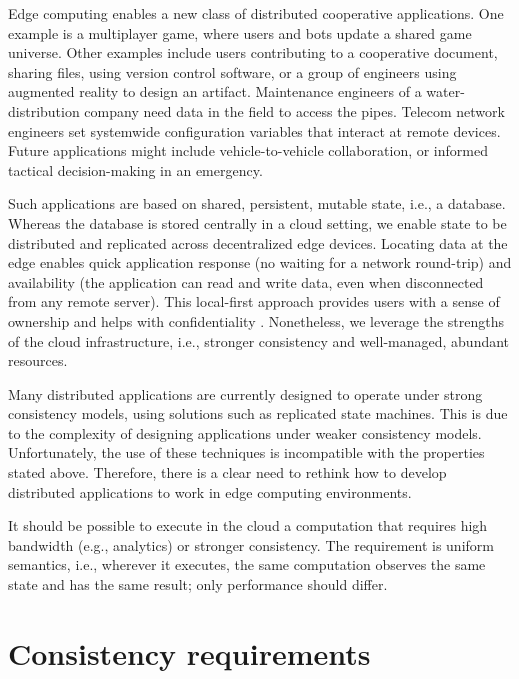 
Edge computing enables a new class of distributed {cooperative}
applications.%
One example is a multiplayer game, where users and bots update a shared
game universe.
Other examples include users contributing to a cooperative document,
sharing files, using version control software, or a group of engineers
using augmented reality to design an artifact.
Maintenance engineers of a water-distribution company need data in the
field to access the pipes.
Telecom network engineers set systemwide configuration variables that
interact at remote devices.
Future applications might include vehicle-to-vehicle collaboration, or
informed tactical decision-making in an emergency.


Such applications are based on shared, persistent, mutable state, i.e.,
a database.
Whereas the database is stored centrally in a cloud setting, we enable
state to be distributed and replicated across decentralized edge
devices.
Locating data at the edge enables quick application response (no waiting
for a network round-trip) and availability (the application can read and
write data, even when disconnected from any remote server).
This local-first approach provides users with a sense of ownership and
helps with confidentiality \cite{rep:app:1827}.
Nonetheless, we leverage the strengths of the cloud infrastructure,
i.e., stronger consistency and well-managed, abundant resources.

Many distributed applications are currently designed to operate under strong consistency models, using solutions such as replicated state machines. This is due to the complexity of designing applications under weaker consistency models. Unfortunately, the use of these techniques is incompatible with the properties stated above. Therefore, there is a clear need to rethink how to develop distributed applications to work in edge computing environments.

It should be possible to execute in the cloud a computation that
requires high bandwidth (e.g., analytics) or stronger consistency.
The requirement is uniform semantics, i.e., wherever it executes, the
same computation observes the same state and has the same result; only
performance should differ.

\section{Consistency requirements}
\label{sec:consistency}
  
